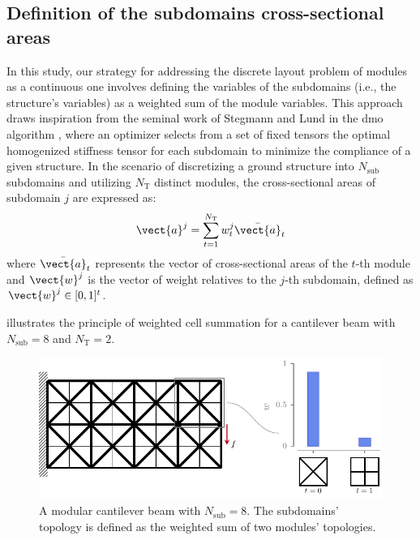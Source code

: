 \subsection{Definition of the subdomains cross-sectional areas}
In this study, our strategy for addressing the discrete layout problem of modules as a continuous one involves defining the variables of the subdomains (i.e., the structure's variables) as a weighted sum of the module variables. This approach draws inspiration from the seminal work of Stegmann and Lund in the \gls{dmo} algorithm , where an optimizer selects from a set of fixed tensors the optimal homogenized stiffness tensor for each subdomain to minimize the compliance of a given structure. In the scenario of discretizing a ground structure into $N_\text{sub}$ subdomains and utilizing $N_\text{T}$ distinct modules, the cross-sectional areas of subdomain $j$ are expressed as:  
\begin{equation}
    \vect{a}^j = \sum_{t=1}^{N_\text{T}} w_t^j \bar{\vect{a}}_t 
\end{equation}
where $\bar{\vect{a}}_t $ represents the vector of cross-sectional areas of the $t$-th module and $\vect{w}^j$ is the vector of weight relatives to the $j$-th subdomain, defined as $ \vect{w}^j \in [0,1]^t$.

 illustrates the principle of weighted cell summation for a cantilever beam with $N_\text{sub}=8$ and $N_\text{T}=2$.

\begin{figure}
    \centering
    \includegraphics{figures/06_DMO/00_weight_dmo/weight_dmo.pdf}
    \caption{A modular cantilever beam with $N_\text{sub}=8$. The subdomains' topology is defined as the weighted sum of two modules' topologies.}
    \label{fig:06_weighted_sum}
\end{figure}

